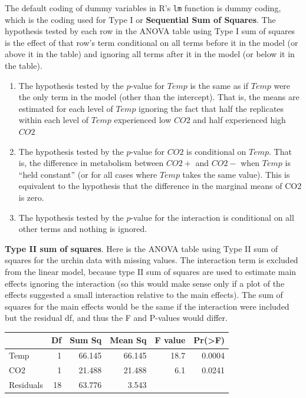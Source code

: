 \documentclass[]{book}
\begin{document}
The default coding of dummy variables in R's \texttt{lm} function is
dummy coding, which is the coding used for Type I or \textbf{Sequential
Sum of Squares}. The hypothesis tested by each row in the ANOVA table
using Type I sum of squares is the effect of that row's term conditional
on all terms before it in the model (or above it in the table) and
ignoring all terms after it in the model (or below it in the table).

\begin{enumerate}
\def\labelenumi{\arabic{enumi}.}
\item
  The hypothesis tested by the \(p\)-value for \(Temp\) is the same as
  if \(Temp\) were the only term in the model (other than the
  intercept). That is, the means are estimated for each level of
  \(Temp\) ignoring the fact that half the replicates within each level
  of \(Temp\) experienced low \(CO2\) and half experienced high \(CO2\)
\item
  The hypothesis tested by the \(p\)-value for \(CO2\) is conditional on
  \(Temp\). That is, the difference in metabolism between \(CO2+\) and
  \(CO2-\) when \(Temp\) is ``held constant'' (or for all cases where
  \(Temp\) takes the same value). This is equivalent to the hypothesis
  that the difference in the marginal means of CO2 is zero.
\item
  The hypothesis tested by the \(p\)-value for the interaction is
  conditional on all other terms and nothing is ignored.
\end{enumerate}

\textbf{Type II sum of squares}. Here is the ANOVA table using Type II
sum of squares for the urchin data with missing values. The interaction
term is excluded from the linear model, because type II sum of squares
are used to estimate main effects ignoring the interaction (so this
would make sense only if a plot of the effects suggested a small
interaction relative to the main effects). The sum of squares for the
main effects would be the same if the interaction were included but the
residual df, and thus the F and P-values would differ.

\begin{tabular}{l|r|r|r|r|r}
\hline
  & Df & Sum Sq & Mean Sq & F value & Pr(>F)\\
\hline
Temp & 1 & 66.145 & 66.145 & 18.7 & 0.0004\\
\hline
CO2 & 1 & 21.488 & 21.488 & 6.1 & 0.0241\\
\hline
Residuals & 18 & 63.776 & 3.543 &  & \\
\hline
\end{tabular}
\end{document}
